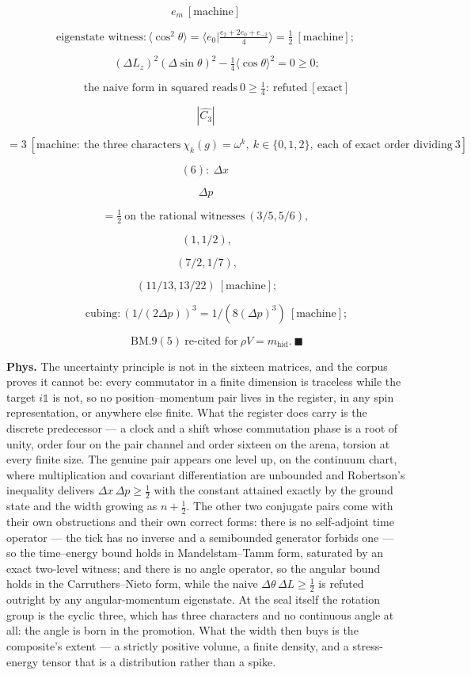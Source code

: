 \documentclass[11pt,openany]{report}
\theoremstyle{canonplain}
\theoremstyle{canondef}
\begin{document}
\[
e_m\ [\text{machine}]
\]

\[
\text{eigenstate witness}: \langle\cos^2\theta\rangle=\langle e_0|\tfrac{e_2+2e_0+e_{-2}}4\rangle=\tfrac12\ [\text{machine}];
\]

\[
\qquad (\Delta L_z)^2(\Delta\sin\theta)^2-\tfrac14\langle\cos\theta\rangle^2=0\ge0;
\]

\[
\qquad \text{the naive form in squared reads}\ 0\ge\tfrac14:\ \text{refuted}\ [\text{exact}]
\]

\[
|\widehat{C_3}|
\]

\[
= 3\ [\text{machine}:\ \text{the three characters}\ \chi_k(g)=\omega^k,\ k\in\{0,1,2\},\ \text{each of exact order dividing}\ 3]
\]

\[
(6):\ \Delta x\,
\]

\[
\Delta p
\]

\[
= \tfrac12\ \text{on the rational witnesses}\ (3/5,5/6),
\]

\[
\ (1,1/2),
\]

\[
\ (7/2,1/7),
\]

\[
\ (11/13,13/22)\ [\text{machine}];
\]

\[
\qquad \text{cubing}: (1/(2\Delta p))^3=1/(8(\Delta p)^3)\ [\text{machine}];
\]

\[
\qquad \mathrm{BM.9}(5)\ \text{re-cited for}\ \rho V=m_{\mathrm{hid}}.\ \blacksquare
\]

\textbf{Phys.} The uncertainty principle is not in the sixteen matrices, and the corpus proves it cannot be: every commutator in a finite dimension is traceless while the target $i\mathbb1$ is not, so no position–momentum pair lives in the register, in any spin representation, or anywhere else finite. What the register does carry is the discrete predecessor — a clock and a shift whose commutation phase is a root of unity, order four on the pair channel and order sixteen on the arena, torsion at every finite size. The genuine pair appears one level up, on the continuum chart, where multiplication and covariant differentiation are unbounded and Robertson's inequality delivers $\Delta x\,\Delta p\ge\tfrac12$ with the constant attained exactly by the ground state and the width growing as $n+\tfrac12$. The other two conjugate pairs come with their own obstructions and their own correct forms: there is no self-adjoint time operator — the tick has no inverse and a semibounded generator forbids one — so the time–energy bound holds in Mandelstam–Tamm form, saturated by an exact two-level witness; and there is no angle operator, so the angular bound holds in the Carruthers–Nieto form, while the naive $\Delta\theta\,\Delta L\ge\tfrac12$ is refuted outright by any angular-momentum eigenstate. At the seal itself the rotation group is the cyclic three, which has three characters and no continuous angle at all: the angle is born in the promotion. What the width then buys is the composite's extent — a strictly positive volume, a finite density, and a stress-energy tensor that is a distribution rather than a spike.
\end{document}

